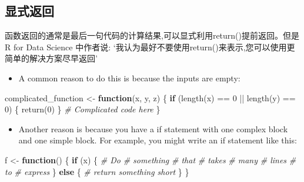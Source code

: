 \documentclass[
]{book}
\newenvironment{Shaded}{\begin{snugshade}}{\end{snugshade}}
\newcommand{\CommentTok}[1]{\textcolor[rgb]{0.56,0.35,0.01}{\textit{#1}}}
\newcommand{\ControlFlowTok}[1]{\textcolor[rgb]{0.13,0.29,0.53}{\textbf{#1}}}
\newcommand{\DecValTok}[1]{\textcolor[rgb]{0.00,0.00,0.81}{#1}}
\newcommand{\FunctionTok}[1]{\textcolor[rgb]{0.00,0.00,0.00}{#1}}
\newcommand{\NormalTok}[1]{#1}
\newcommand{\OtherTok}[1]{\textcolor[rgb]{0.56,0.35,0.01}{#1}}
\newcommand{\SpecialCharTok}[1]{\textcolor[rgb]{0.00,0.00,0.00}{#1}}
\providecommand{\tightlist}{%
  \setlength{\itemsep}{0pt}\setlength{\parskip}{0pt}}
\begin{document}
\hypertarget{ux663eux5f0fux8fd4ux56de}{%
\subsection{显式返回}\label{ux663eux5f0fux8fd4ux56de}}

函数返回的通常是最后一句代码的计算结果,可以显式利用return()提前返回。但是R for Data Science 中作者说:
`我认为最好不要使用return()来表示,您可以使用更简单的解决方案尽早返回'

\begin{itemize}
\tightlist
\item
  A common reason to do this is because the inputs are empty:
\end{itemize}

\begin{Shaded}
\begin{Highlighting}[]
\NormalTok{complicated\_function }\OtherTok{\textless{}{-}} \ControlFlowTok{function}\NormalTok{(x, y, z) \{}
  \ControlFlowTok{if}\NormalTok{ (}\FunctionTok{length}\NormalTok{(x) }\SpecialCharTok{==} \DecValTok{0} \SpecialCharTok{||} \FunctionTok{length}\NormalTok{(y) }\SpecialCharTok{==} \DecValTok{0}\NormalTok{) \{}
    \FunctionTok{return}\NormalTok{(}\DecValTok{0}\NormalTok{)}
\NormalTok{  \}}
  \CommentTok{\# Complicated code here}
\NormalTok{\}}
\end{Highlighting}
\end{Shaded}

\begin{itemize}
\tightlist
\item
  Another reason is because you have a if statement with one complex block and one simple block. For example, you might write an if statement like this:
\end{itemize}

\begin{Shaded}
\begin{Highlighting}[]
\NormalTok{f }\OtherTok{\textless{}{-}} \ControlFlowTok{function}\NormalTok{() \{}
  \ControlFlowTok{if}\NormalTok{ (x) \{}
    \CommentTok{\# Do }
    \CommentTok{\# something}
    \CommentTok{\# that}
    \CommentTok{\# takes}
    \CommentTok{\# many}
    \CommentTok{\# lines}
    \CommentTok{\# to}
    \CommentTok{\# express}
\NormalTok{  \} }\ControlFlowTok{else}\NormalTok{ \{}
    \CommentTok{\# return something short}
\NormalTok{  \}}
\NormalTok{\}}
\end{Highlighting}
\end{Shaded}
\end{document}
